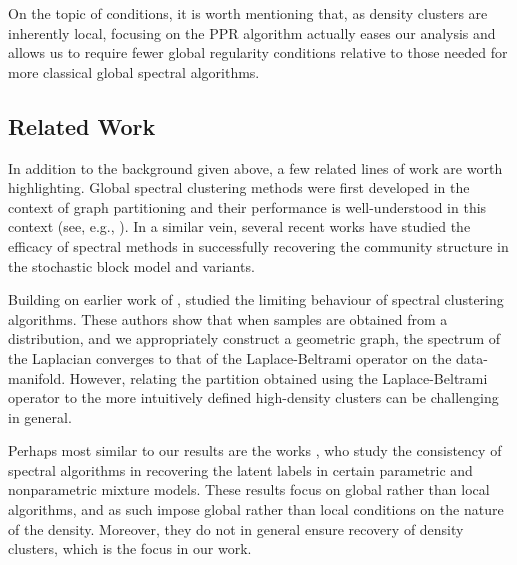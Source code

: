 \documentclass{article}
\newcommand{\1}{\mathbf{1}}
\theoremstyle{aldenthm}
\theoremstyle{aldenrmrk}
\begin{document}
On the topic of conditions, it is worth mentioning that, as density clusters
are inherently local, focusing on the PPR algorithm actually eases our analysis
and allows us to require fewer global regularity conditions relative to those
needed for more classical global spectral algorithms.    

\subsection{Related Work}

In addition to the background given above, a few related lines of work are worth
highlighting.
Global spectral clustering methods were first developed in the
context of graph partitioning \citep{fiedler1973,donath1973} and their
performance is well-understood in this context (see, e.g.,
\citealt{tolliver2006,luxburg2007}).  In a similar vein, several recent works
\citep{mcsherry2001,rohe2011,kamalika2012,balakrishnan2011,lei2015,abbe2018} 
have studied the efficacy of spectral methods in successfully recovering the
community structure in the stochastic block model and variants.

Building on earlier work of
\citep{koltchinskii2000}, \citep{vonluxburg2008,hein2005} studied the limiting behaviour of spectral clustering
algorithms. These authors show that when samples are obtained from a
distribution, and we appropriately construct a geometric graph, the spectrum of
the Laplacian converges to that of the Laplace-Beltrami operator on the
data-manifold. However, relating the partition obtained using the
Laplace-Beltrami operator to the more intuitively defined high-density
clusters can be challenging in general.



Perhaps most similar to our results are the works
\citep{vempala2004,shi2009,schiebinger2015}, who study the consistency of
spectral algorithms in recovering the latent labels in certain parametric and
nonparametric mixture models. These results focus on global rather than local
algorithms, and as such impose global rather than local conditions on the nature
of the density. Moreover, they do not in general ensure recovery of density
clusters, which is the focus in our work. 
\end{document}
